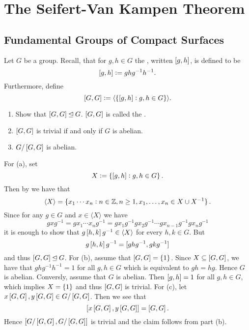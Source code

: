 \chapter{The Seifert-Van Kampen Theorem}
\section{Fundamental Groups of Compact Surfaces}
\begin{exercise}
Let $G$ be a group. Recall, that for $g,h \in G$ the , written $\sbr[0]{g,h}$, is defined to be
\begin{equation}
\sbr[0]{g,h} := ghg^{-1}h^{-1}.
\end{equation}
Furthermore, define
\begin{equation}
\sbr[0]{G,G} := \langle \cbr[0]{\sbr[0]{g,h} : g,h \in G} \rangle.
\end{equation}
\begin{enumerate}[label = \textup{(}\alph*\textup{)}]
\item Show that $\sbr[0]{G,G} \unlhd G$. $\sbr[0]{G,G}$ is called the .
\item $\sbr[0]{G,G}$ is trivial if and only if $G$ is abelian.
\item $G/\sbr[0]{G,G}$ is abelian.
\end{enumerate}
\end{exercise}

\begin{solution}
For (a), set 
\begin{equation*}
X := \cbr[0]{\sbr[0]{g,h} : g,h \in G}.
\end{equation*}
Then by \cite[31]{karpfinger:algebra:2013} we have that 
\begin{equation*}
\langle X \rangle = \cbr[0]{x_1 \cdots x_n : n \in \mathbb{Z}, n \geq 1,x_1,\dots,x_n \in X \cup X^{-1}}.
\end{equation*}
Since for any $g \in G$ and $x \in \langle X \rangle$ we have
\begin{equation*}
gxg^{-1} = gx_1 \cdots x_n g^{-1} = gx_1g^{-1}gx_2 g^{-1} \cdots gx_{n-1}g^{-1}gx_ng^{-1}
\end{equation*}
\noindent it is enough to show that $g\sbr[0]{h,k}g^{-1} \in \langle X \rangle$ for every $h,k \in G$. But
\begin{equation*}
g\sbr[0]{h,k}g^{-1} = \sbr[0]{ghg^{-1},gkg^{-1}}
\end{equation*}
\noindent and thus $\sbr[0]{G,G} \unlhd G$. For (b), assume that $\sbr[0]{G,G} = \cbr[0]{1}$. Since $X \subseteq \sbr[0]{G,G}$, we have that $ghg^{-1}h^{-1} = 1$ for all $g,h \in G$ which is equivalent to $gh = hg$. Hence $G$ is abelian. Conversly, assume that $G$ is abelian. Then $\sbr[0]{g,h} = 1$ for all $g,h \in G$, which implies $X = \cbr[0]{1}$ and thus $\sbr[0]{G,G}$ is trivial. For (c), let $x\sbr[0]{G,G},y\sbr[0]{G,G} \in G/\sbr[0]{G,G}$. Then we see that
\begin{equation*}
\sbr[0]{x\sbr[0]{G,G},y\sbr[0]{G,G}} = \sbr[0]{G,G}.
\end{equation*}
Hence $\sbr[0]{G/\sbr[0]{G,G},G/\sbr[0]{G,G}}$ is trivial and the claim follows from part (b).
\end{solution}